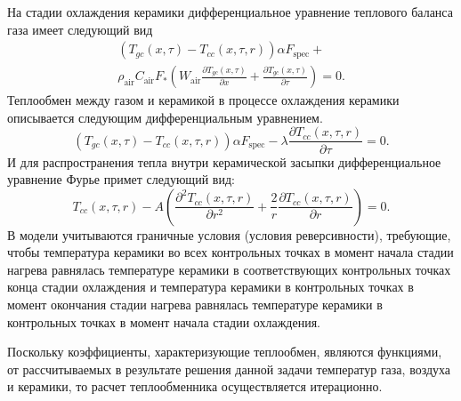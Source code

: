 \documentclass[a4paper,12pt]{article}
\begin{document}
На стадии охлаждения керамики дифференциальное уравнение теплового баланса
газа имеет следующий вид
\begin{equation}
    \begin{array}{ll}
        \left( T_{gc}(x,\tau) - T_{cc}(x,\tau,r) \right) \alpha F_{\text{spec}}+\\
        \rho_{\text{air}} C_{\text{air}} F_{*}
        \left( W_{\text{air}} \frac{\partial T_{gc} (x, \tau)}{\partial x} + 
        \frac{\partial T_{gc} (x, \tau)}{\partial \tau} \right) = 0.
    \end{array}
    \label{gascool}
\end{equation}
Теплообмен между газом и керамикой в процессе охлаждения керамики
описывается следующим дифференциальным уравнением. 
\begin{equation}
    \left( T_{gc}(x,\tau) - T_{cc}(x,\tau,r) \right) \alpha F_{\text{spec}}-
    \lambda \frac{\partial T_{cc} (x, \tau, r)}{\partial \tau} = 0.
    \label{surfcool}
\end{equation}
И для распространения тепла внутри керамической засыпки дифференциальное
уравнение Фурье примет следующий вид:
\begin{equation}
    T_{cc}(x,\tau,r) - A \left( 
    \frac{ \partial^2 T_{cc}(x,\tau,r)}{\partial r^2} +
    \frac{2}{r} \frac{ \partial T_{cc}(x,\tau,r)}{\partial r} \right) = 0.
    \label{cercool}
\end{equation}
В модели учитываются граничные условия (условия реверсивности), требующие,
чтобы температура керамики во всех контрольных точках в момент начала
стадии нагрева равнялась температуре керамики в соответствующих контрольных
точках конца стадии охлаждения и температура керамики в контрольных точках
в момент окончания стадии нагрева равнялась температуре керамики в
контрольных точках в момент начала стадии охлаждения. 

Поскольку коэффициенты, характеризующие теплообмен, являются функциями, от
рассчитываемых в результате решения данной задачи температур газа, воздуха
и керамики, то расчет теплообменника осуществляется итерационно.
\end{document}
